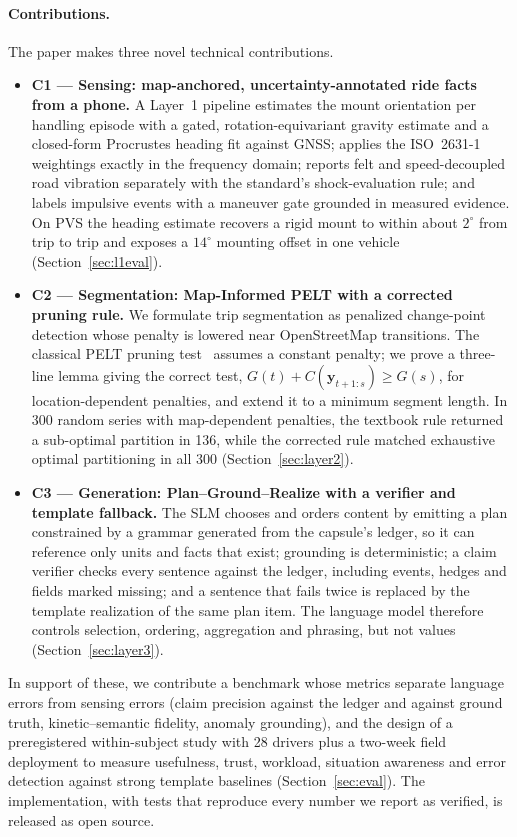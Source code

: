 \paragraph{Contributions.}
The paper makes three novel technical contributions.
\begin{itemize}
\item \textbf{C1 --- Sensing: map-anchored, uncertainty-annotated ride facts from a phone.}
  A Layer~1 pipeline estimates the mount orientation per handling episode with a gated, rotation-equivariant gravity estimate and a closed-form Procrustes heading fit against GNSS; applies the ISO~2631-1 weightings exactly in the frequency domain; reports felt and speed-decoupled road vibration separately with the standard's shock-evaluation rule; and labels impulsive events with a maneuver gate grounded in measured evidence.
  On PVS the heading estimate recovers a rigid mount to within about $2^\circ$ from trip to trip and exposes a $14^\circ$ mounting offset in one vehicle (Section~\ref{sec:l1eval}).
\item \textbf{C2 --- Segmentation: Map-Informed PELT with a corrected pruning rule.}
  We formulate trip segmentation as penalized change-point detection whose penalty is lowered near OpenStreetMap transitions.
  The classical PELT pruning test~\cite{killick2012pelt} assumes a constant penalty; we prove a three-line lemma giving the correct test, $G(t)+C(\mathbf y_{t+1:s})\ge G(s)$, for location-dependent penalties, and extend it to a minimum segment length.
  In 300 random series with map-dependent penalties, the textbook rule returned a sub-optimal partition in 136, while the corrected rule matched exhaustive optimal partitioning in all 300 (Section~\ref{sec:layer2}).
\item \textbf{C3 --- Generation: Plan--Ground--Realize with a verifier and template fallback.}
  The SLM chooses and orders content by emitting a plan constrained by a grammar generated from the capsule's ledger, so it can reference only units and facts that exist; grounding is deterministic; a claim verifier checks every sentence against the ledger, including events, hedges and fields marked missing; and a sentence that fails twice is replaced by the template realization of the same plan item.
  The language model therefore controls selection, ordering, aggregation and phrasing, but not values (Section~\ref{sec:layer3}).
\end{itemize}
In support of these, we contribute a benchmark whose metrics separate language errors from sensing errors (claim precision against the ledger and against ground truth, kinetic--semantic fidelity, anomaly grounding), and the design of a preregistered within-subject study with 28 drivers plus a two-week field deployment to measure usefulness, trust, workload, situation awareness and error detection against strong template baselines (Section~\ref{sec:eval}).
The implementation, with tests that reproduce every number we report as verified, is released as open source.

